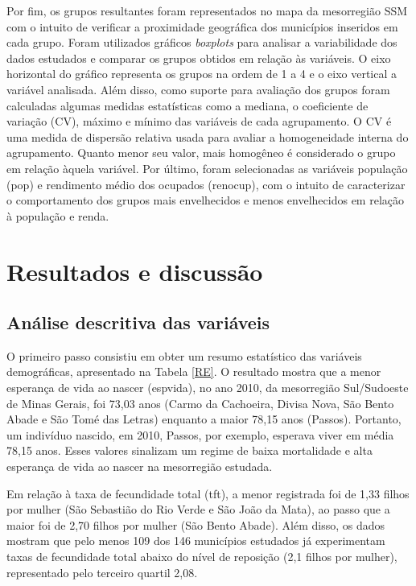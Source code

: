 \documentclass[10pt,twoside]{article}
\begin{document}
Por fim, os grupos resultantes foram representados no mapa da mesorregião SSM com o intuito de verificar a proximidade geográfica dos municípios inseridos em cada grupo. Foram utilizados gráficos \textit{boxplots} para analisar a variabilidade dos dados estudados e comparar os grupos obtidos em relação às variáveis. O eixo horizontal do gráfico representa os grupos na ordem de 1 a 4 e o eixo vertical a variável analisada. Além disso, como suporte para avaliação dos grupos foram calculadas algumas medidas estatísticas como a mediana, o coeficiente de variação (CV), máximo e mínimo das variáveis de cada agrupamento. O CV é uma medida de dispersão relativa usada para avaliar a homogeneidade interna do agrupamento. Quanto menor seu valor, mais homogêneo é considerado o grupo em relação àquela variável. Por último, foram selecionadas as variáveis população (pop) e rendimento médio dos ocupados (renocup), com o intuito de caracterizar o comportamento dos grupos mais envelhecidos e menos envelhecidos em relação à população e renda.

\medskip


\section{\textbf{Resultados e discussão}}
	
\medskip

\subsection{Análise descritiva das variáveis}

O primeiro passo consistiu em obter um resumo estatístico das variáveis demográficas, apresentado na Tabela \ref{RE}. O resultado mostra que a menor esperança de vida ao nascer (espvida), no ano 2010, da mesorregião Sul/Sudoeste de Minas Gerais, foi 73,03 anos (Carmo da Cachoeira, Divisa Nova, São Bento Abade e São Tomé das Letras) enquanto a maior 78,15 anos (Passos). Portanto, um indivíduo nascido, em 2010, Passos, por exemplo, esperava viver em média 78,15 anos. Esses valores sinalizam um regime de baixa mortalidade e alta esperança de vida ao nascer na mesorregião estudada. 

Em relação à taxa de fecundidade total (tft), a menor registrada foi de 1,33 filhos por mulher (São Sebastião do Rio Verde e São João da Mata), ao passo que a maior foi de 2,70 filhos por mulher (São Bento Abade). Além disso, os dados mostram que pelo menos 109 dos 146 municípios estudados já experimentam taxas de fecundidade total abaixo do nível de reposição (2,1 filhos por mulher), representado pelo terceiro quartil 2,08. 
\end{document}
